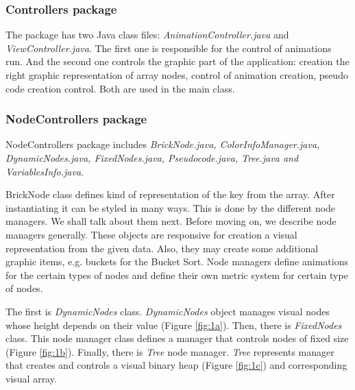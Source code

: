 \documentclass[
  field=inf,
  biblatex,
  language=english,
  glossaries,
  theorems=false,
  sourcecodes=false,
  index
]{kidiplom}
\begin{document}
\subsubsection{Controllers package}
The package has two Java class files: \textit{AnimationController.java} and \textit{ViewController.java}. The first one is responsible for the control of animations run. And the second one controls the graphic part of the application: creation the right graphic representation of array nodes, control of animation creation, pseudo code creation control. Both are used in the main class.

\subsubsection{NodeControllers package}
NodeControllers package includes \textit{BrickNode.java, ColorInfoManager.java, DynamicNodes.java, FixedNodes.java, Pseudocode.java, Tree.java and Vari\-ables\-Info.java}.

BrickNode class defines kind of representation of the key from the array. After instantiating it can be styled in many ways. This is done by the different node managers. We shall talk about them next. Before moving on, we describe node managers generally. These objects are responsive for creation a visual representation from the given data. Also, they may create some additional graphic items, e.g. buckets for the Bucket Sort. Node managers define animations for the certain types of nodes and define their own metric system for certain type of nodes.

The first is \textit{DynamicNodes} class. \textit{DynamicNodes} object manages visual nodes whose height depends on their value (Figure \ref{fig:1a}). Then, there is \textit{FixedNodes} class. This node manager class defines a manager that controls nodes of fixed size (Figure \ref{fig:1b}). Finally, there is \textit{Tree} node manager. \textit{Tree} represents manager that creates and controls a visual binary heap (Figure \ref{fig:1c}) and corresponding visual array. 
\end{document}
